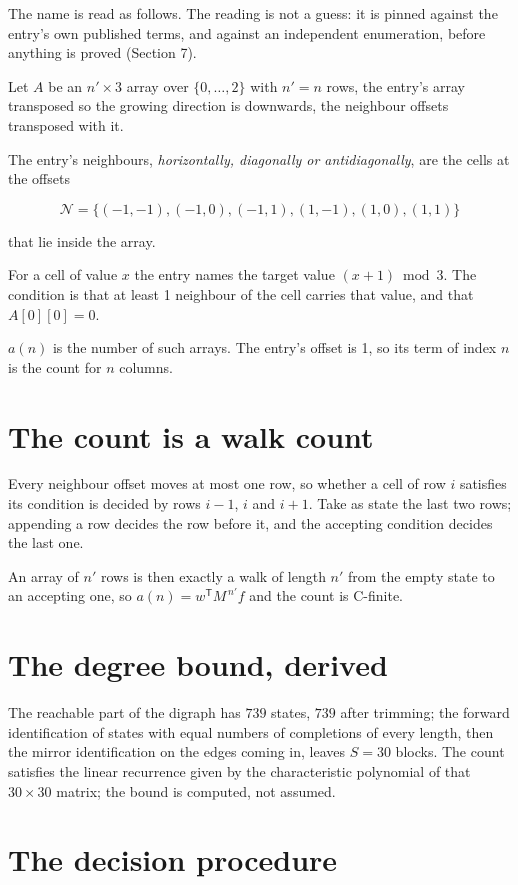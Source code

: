 \documentclass[11pt]{article}
\theoremstyle{definition}
\begin{document}
The name is read as follows. The reading is not a guess: it is pinned against the entry's own published terms, and against an independent enumeration, before anything is proved (Section 7).

Let $A$ be an $n' \times 3$ array over $\{0,\dots,2\}$ with $n' = n$ rows, the entry's array transposed so the growing direction is downwards, the neighbour offsets transposed with it.

The entry's neighbours, {\itshape horizontally, diagonally or antidiagonally}, are the cells at the offsets

\[\mathcal{N} = \{(-1,-1), (-1,0), (-1,1), (1,-1), (1,0), (1,1)\}\]

that lie inside the array.

For a cell of value $x$ the entry names the target value $(x + 1) \bmod 3$. The condition is that at least 1 neighbour of the cell carries that value, and that $A[0][0] = 0$.

$a(n)$ is the number of such arrays. The entry's offset is 1, so its term of index $n$ is the count for $n$ columns.

\section{The count is a walk count}

Every neighbour offset moves at most one row, so whether a cell of row $i$ satisfies its condition is decided by rows $i-1$, $i$ and $i+1$. Take as state the last two rows; appending a row decides the row before it, and the accepting condition decides the last one.

An array of $n'$ rows is then exactly a walk of length $n'$ from the empty state to an accepting one, so $a(n) = w^{\mathsf T}M^{\,n'}f$ and the count is C-finite.

\section{The degree bound, derived}

The reachable part of the digraph has $739$ states, $739$ after trimming; the forward identification of states with equal numbers of completions of every length, then the mirror identification on the edges coming in, leaves $S = 30$ blocks. The count satisfies the linear recurrence given by the characteristic polynomial of that $30\times30$ matrix; the bound is computed, not assumed.

\section{The decision procedure}
\end{document}
